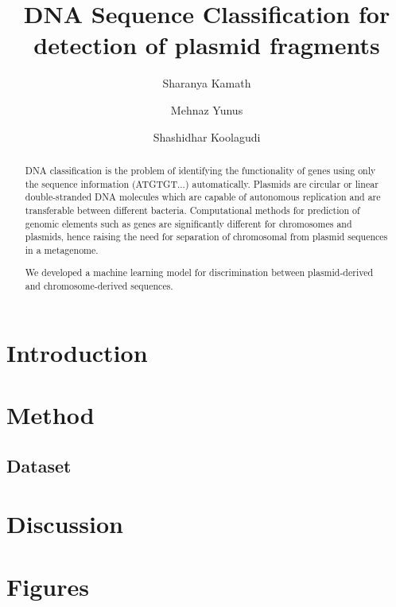 \documentclass[12pt]{article}
\title{DNA Sequence Classification for detection of plasmid fragments}
\author{Sharanya Kamath}
\author{Mehnaz Yunus}
\author{Shashidhar Koolagudi}
\affil{National Institute of Technology, Karnataka}
\begin{document}
\maketitle

\begin{abstract}
DNA classification is the problem of identifying the functionality of genes using only the sequence information (ATGTGT...) automatically. Plasmids are circular or linear double-stranded DNA molecules which are capable of autonomous replication and are transferable between different bacteria. Computational methods for prediction of genomic elements such as genes are significantly different for chromosomes and plasmids, hence raising the need for separation of chromosomal from plasmid sequences in a metagenome.

We developed a machine learning model for discrimination between plasmid-derived and chromosome-derived sequences.

\end{abstract}

\section{Introduction}

\section{Method}

\subsection{Dataset}

\section{Discussion}

\section{Figures}

\renewcommand\refname{Bibliography}

  

\end{document}
